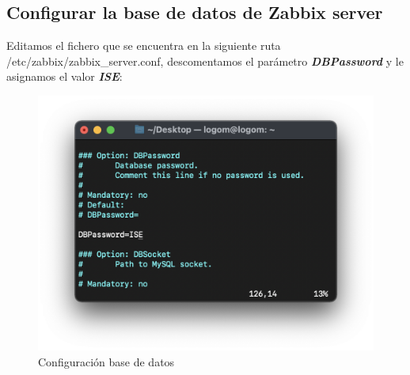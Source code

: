     \subsection{Configurar la base de datos de Zabbix server}
    Editamos el fichero que se encuentra en la siguiente ruta /etc/zabbix/zabbix\_server.conf, descomentamos el parámetro \textbf{\emph{DBPassword}} y le asignamos el valor
    \textbf{\emph{ISE}}:
    \begin{figure}[H]
        \centering
        \includegraphics[scale=0.4]{images/zabbix_server_conf.png}
        \caption{Configuración base de datos}
        \label{fig:zabbix_conf}
    \end{figure}

